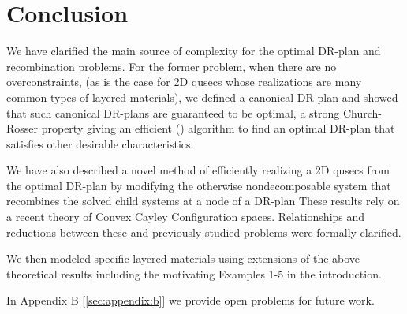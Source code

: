 \section{Conclusion}
% 

We have clarified the main source of complexity for the optimal DR-plan and recombination problems. For the former problem, when there are no overconstraints, (as is the case for 2D qusecs whose realizations are many common types of layered materials), we defined a canonical DR-plan and showed that such canonical DR-plans are guaranteed to be optimal, a strong Church-Rosser property giving an efficient (\candrpcomplexity) algorithm to find an optimal  DR-plan that satisfies other desirable characteristics.

We have also described a novel method of efficiently realizing a 2D qusecs from the optimal DR-plan by modifying the otherwise nondecomposable system that recombines the solved child systems at a node of a DR-plan These results rely on a recent theory of Convex Cayley Configuration spaces. Relationships and reductions between these and previously studied problems were formally clarified.

We then modeled specific layered materials using extensions of the above theoretical results including the motivating Examples 1-5 in the introduction.

In Appendix B [\ref{sec:appendix:b}] we provide open problems for future work.
